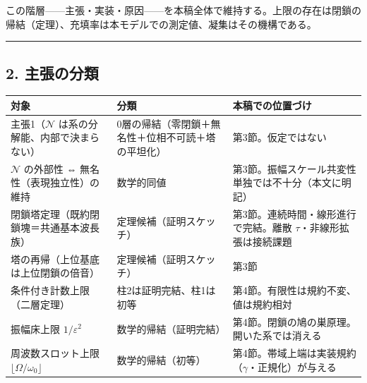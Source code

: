 \documentclass[
  a4paper,
]{ltjsarticle}
\newcounter{none} %
\begin{document}
この階層------主張・実装・原因------を本稿全体で維持する。上限の存在は閉鎖の帰結（定理）、充填率は本モデルでの測定値、凝集はその機構である。

\begin{center}\rule{0.5\linewidth}{0.5pt}\end{center}

\subsection{2. 主張の分類}\label{ux4e3bux5f35ux306eux5206ux985e}

{\def\LTcaptype{none} %
\begin{longtable}[]{@{}
  >{\raggedright\arraybackslash}p{}
  >{\raggedright\arraybackslash}p{}
  >{\raggedright\arraybackslash}p{}@{}}
\toprule\noalign{}
\begin{minipage}[b]{\linewidth}\raggedright
対象
\end{minipage} & \begin{minipage}[b]{\linewidth}\raggedright
分類
\end{minipage} & \begin{minipage}[b]{\linewidth}\raggedright
本稿での位置づけ
\end{minipage} \\
\midrule\noalign{}
\endhead
\bottomrule\noalign{}
\endlastfoot
主張1（\(\mathcal N\) は系の分解能、内部で決まらない） &
0層の帰結（零閉鎖＋無名性＋位相不可読＋塔の平坦化） &
第3節。仮定ではない \\
\(\mathcal N\) の外部性 ⇔ 無名性（表現独立性）の維持 & 数学的同値 &
第3節。振幅スケール共変性単独では不十分（本文に明記） \\
閉鎖塔定理（既約閉鎖塊＝共通基本波長族） & 定理候補（証明スケッチ） &
第3節。連続時間・線形進行で完結。離散 \(\tau\)・非線形拡張は接続課題 \\
塔の再帰（上位基底は上位閉鎖の倍音） & 定理候補（証明スケッチ） &
第3節 \\
条件付き計数上限（二層定理） & 柱2は証明完結、柱1は初等 &
第4節。有限性は規約不変、値は規約相対 \\
振幅床上限 \(1/\varepsilon^2\) & 数学的帰結（証明完結） &
第4節。閉鎖の鳩の巣原理。開いた系では消える \\
周波数スロット上限 \(\lfloor\Omega/\omega_0\rfloor\) &
数学的帰結（初等） &
第4節。帯域上端は実装規約（\(\gamma\)・正規化）が与える \\

\end{longtable}}
\end{document}
